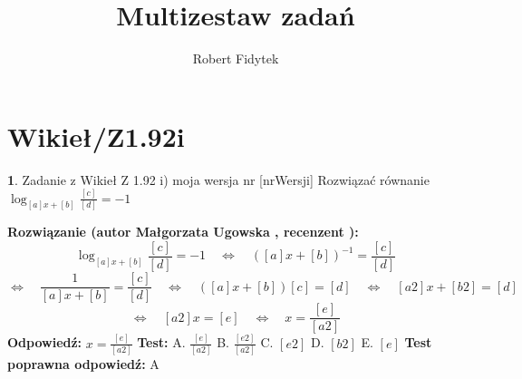 \documentclass[12pt, a4paper]{article}
\title{Multizestaw zadań}
\author{Robert Fidytek}
\date{}
\theoremstyle{definition} %
\newtheorem{zad}{}
\newcommand{\kategoria}[1]{\section{#1}} %
\newcommand{\zadStart}[1]{\begin{zad}#1\newline} %
\newcommand{\zadStop}{\end{zad}}   %
\newcommand{\rozwStart}[2]{\noindent \textbf{Rozwiązanie (autor #1 , recenzent #2): }\newline} %
\newcommand{\rozwStop}{\newline}                                            %
\newcommand{\odpStart}{\noindent \textbf{Odpowiedź:}\newline}    %
\newcommand{\odpStop}{\newline}                                             %
\newcommand{\testStart}{\noindent \textbf{Test:}\newline} %
\newcommand{\testStop}{\newline} %
\newcommand{\kluczStart}{\noindent \textbf{Test poprawna odpowiedź:}\newline} %
\newcommand{\kluczStop}{\newline} %
\begin{document}
\maketitle


\kategoria{Wikieł/Z1.92i}
\zadStart{Zadanie z Wikieł Z 1.92 i) moja wersja nr [nrWersji]}
Rozwiązać równanie $\log_{[a]x+[b]}{\frac{[c]}{[d]}}=-1$
\zadStop
\rozwStart{Małgorzata Ugowska}{}
$$\log_{[a]x+[b]}{\frac{[c]}{[d]}}=-1 \quad \Longleftrightarrow \quad {([a]x+[b])}^{-1}=\frac{[c]}{[d]} $$
$$ \Longleftrightarrow \quad \frac{1}{[a]x+[b]}=\frac{[c]}{[d]} \quad \Longleftrightarrow \quad ([a]x+[b])[c]=[d] \quad \Longleftrightarrow \quad [a2]x+[b2]=[d] $$
$$ \Longleftrightarrow \quad [a2]x=[e] \quad \Longleftrightarrow \quad x=\frac{[e]}{[a2]}$$
\rozwStop
\odpStart
$x=\frac{[e]}{[a2]}$
\odpStop
\testStart
A. $\frac{[e]}{[a2]}$
B. $\frac{[e2]}{[a2]}$
C. $[e2]$
D. $[b2]$
E. $[e]$
\testStop
\kluczStart
A
\kluczStop
\end{document}
